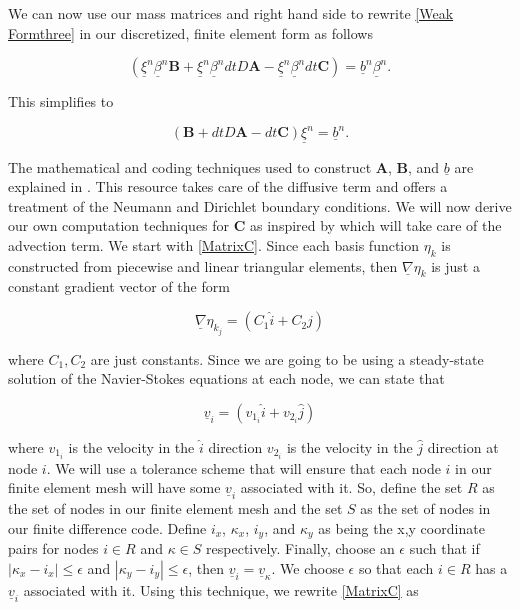 \documentclass[a4paper]{article}
\newcommand\abs[1]{\left|#1\right|}
\theoremstyle{remark}
\theoremstyle{remark}
\begin{document}
We can now use our mass matrices and right hand side to rewrite \eqref{Weak Formthree} in our discretized, finite element form as follows

\begin{equation} \label{massmatricesnoC}
\left(\underline{\xi}^{n}\underline{\beta}^{n}\mathbf{B}+\underline{\xi}^{n}\underline{\beta}^{n}dtD\mathbf{A}-\underline{\xi}^{n}\underline{\beta}^{n}dt\mathbf{C}\right)=\underline{b}^{n}\underline{\beta}^{n}.
\end{equation}

\noindent This simplifies to 

\begin{equation} \label{Final Linear System}
\left(\mathbf{B}+dtD\mathbf{A}-dt\mathbf{C}\right)\underline{\xi}^{n}=\underline{b}^{n}.
\end{equation}


The mathematical and coding techniques used to construct $\mathbf{A}$, $\mathbf{B}$, and $\underline{b}$ are explained in \cite{50LinesofMATLAB}. This resource takes care of the diffusive term and offers a treatment of the Neumann and Dirichlet boundary conditions. We will now derive our own computation techniques for $\mathbf{C}$ as inspired by \cite{50LinesofMATLAB} which will take care of the advection term. We start with \eqref{MatrixC}. Since each basis function $\eta_{k}$ is constructed from piecewise and linear triangular elements, then $\underline{\nabla}\eta_{k}$ is just a constant gradient vector of the form

\begin{equation}\label{gradeta}
\underline{\nabla}\eta_{k_{j}}=\left(C_{1}\hat{i}+C_{2}\hat{j}\right)
\end{equation}

\noindent where $C_{1},C_{2}$ are just constants. Since we are going to be using a steady-state solution of the Navier-Stokes equations at each node, we can state that

\begin{equation}\label{velocityterm}
\underline{v}_{i}=\left(v_{1_{i}}\hat{i}+v_{2_{i}}\hat{j}\right)
\end{equation}

\noindent where $v_{1_{i}}$ is the velocity in the $\hat{i}$ direction $v_{2_{i}}$ is the velocity in the $\hat{j}$ direction at node $i$. We will use a tolerance scheme that will ensure that each node $i$ in our finite element mesh will have some $\underline{v}_{i}$ associated with it. So, define the set $R$ as the set of nodes in our finite element mesh and the set $S$ as the set of nodes in our finite difference code. Define $i_{x}$, $\kappa_{x}$, $i_{y}$, and $\kappa_{y}$ as being the x,y coordinate pairs for nodes $i \in R$ and $\kappa \in S$ respectively. Finally, choose an $\epsilon$ such that if $\abs{\kappa_{x}-i_{x}}\leq \epsilon$ and $\abs{\kappa_{y}-i_{y}}\leq \epsilon$, then $\underline{v}_{i}=\underline{v}_{\kappa}$. We choose $\epsilon$ so that each $i \in R$ has a $\underline{v}_{i}$ associated with it. Using this technique, we rewrite \eqref{MatrixC} as
\end{document}
